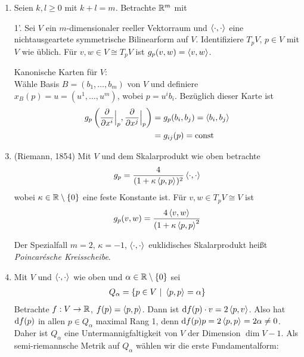 \documentclass{skript}
\begin{document}
\begin{bsps}
  \begin{enumerate}
    \item Seien $k,l\geq 0$ mit $k+l=m$. Betrachte $\mathbb{R}^m$ mit 
    \item[1'\!\!.] Sei $V$ ein $m$-dimensionaler reeller Vektorraum und
      $\sprod{\cdot,\cdot}$ eine nichtausgeartete symmetrische Bilinearform auf
      $V$. Identifiziere $T_pV$, $p\in V$ mit $V$ wie üblich. Für $v,w \in V
      \cong T_pV$ ist $g_p(v,w) = \sprod{v,w}$.

      Kanonische Karten für $V$: \\
      Wähle Basis $B=(b_1, \ldots, b_m)$ von $V$ und definiere $x_B(p) = u =
      (u^1, \ldots, u^m)$, wobei $p = u^ib_i$. Bezüglich dieser Karte ist
      \begin{align*}
        g_p\left( \del{i}\Big|_p, \del{j}\Big|_p \right) &= g_p(b_i, b_j) =
        \sprod{b_i, b_j} \\ &= g_{ij}(p) = \text{const}
      \end{align*}
    \item (Riemann, 1854) Mit $V$ und dem Skalarprodukt wie oben betrachte
      \begin{align*}
        g_p = \frac{4}{(1+\kappa\sprod{p,p})^2}\sprod{\cdot, \cdot}
      \end{align*}
      wobei $\kappa\in\R\setminus\mdef{0}$ eine feste Konstante ist. Für
      $v,w\in T_pV\cong V$ ist
      \begin{align*}
        g_p(v,w) = \frac{4\sprod{v,w}}{(1+\kappa\sprod{p,p}^2}
      \end{align*}

      Der Spezialfall $m=2$, $\kappa = -1$, $\sprod{\cdot,\cdot}$ euklidisches
      Skalarprodukt heißt \emph{Poincar\'esche Kreisscheibe}.

    \item Mit $V$ und $\sprod{\cdot,\cdot}$ wie oben und
      $\alpha\in\R\setminus\mdef{0}$ sei
      \begin{align*}
        Q_\alpha = \mdef[p\in V]{\sprod{p,p} = \alpha}
      \end{align*}
      Betrachte $f:V\to\mathbb{R}$, $f(p) = \sprod{p,p}$. Dann ist $\d f(p)\cdot v =
      2\sprod{p,v}$. Also hat $\mathrm d f(p)$ in allen $p\in Q_\alpha$ maximal Rang 1,
      denn $\d f(p)p = 2\sprod{p,p} = 2\alpha \ne 0$. Daher ist $Q_\alpha$ eine
      Untermannigfaltigkeit von $V$ der Dimension $\operatorname{dim}V - 1$. Als
      semi-riemannsche Metrik auf $Q_\alpha$ wählen wir die erste
      Fundamentalform:


\end{enumerate}
\end{bsps}
\end{document}
